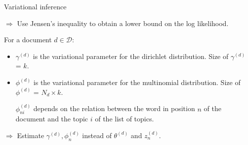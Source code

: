 \documentclass[final]{beamer}
\newlength{\onecolwid}
\newlength{\twocolwid}
\begin{document}
\begin{frame}[t]
\begin{columns}[t]
\begin{column}{\twocolwid}
\begin{columns}[t,totalwidth=\twocolwid]
\end{columns} %






\begin{columns}[t,totalwidth=\twocolwid] %

\begin{column}{\onecolwid} %


\begin{block}{Variational inference}

$\Rightarrow$ Use Jensen's inequality to obtain a lower bound on the log likelihood.

For a document $d \in \mathcal{D}$:
 \begin{itemize}
  \item $\gamma^{(d)}$ is the variational parameter for the dirichlet distribution. Size of $\gamma^{(d)}$ = $k$.
  \item $\phi^{(d)}$ is the variational parameter for the multinomial distribution. Size of $\phi^{(d)}$ = $N_d \times k$.
  
  $\phi_{ni}^{(d)}$ depends on the relation between the word in position $n$ of the document and the topic $i$ of the list of topics.
   \end{itemize}

$\Rightarrow$ Estimate $\gamma^{(d)}, \phi_{n}^{(d)}$ instead of $\theta^{(d)}$ and $z_n^{(d)}$.


\end{block}
\end{column}
\end{columns}
\end{column}
\end{columns}
\end{frame}
\end{document}
